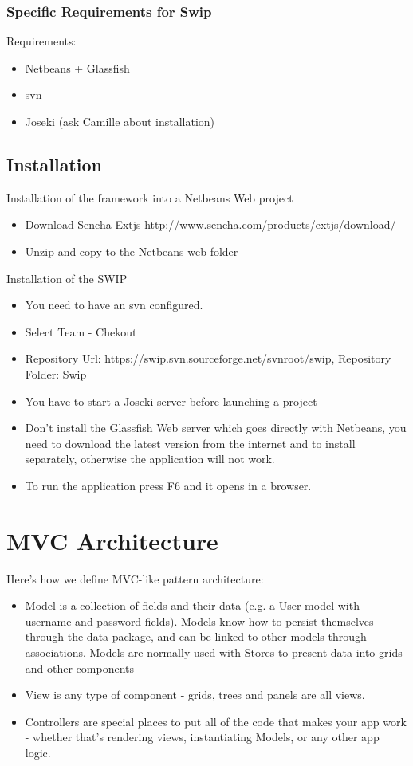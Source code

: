 \subsection{Specific Requirements for Swip}
\par Requirements:
\begin{itemize}
\item Netbeans + Glassfish
\item svn
\item Joseki (ask Camille about installation)
\end{itemize}
   
\section{Installation}

 Installation of the framework into a Netbeans Web project
\begin{itemize}
   \item Download Sencha Extjs  http://www.sencha.com/products/extjs/download/
   \item Unzip and copy to the Netbeans web folder
\end{itemize}
 Installation of the SWIP
\begin{itemize}  
\item You need to have an svn configured.
\item Select Team - Chekout 
\item Repository Url: https://swip.svn.sourceforge.net/svnroot/swip, Repository Folder: Swip
\item You have to start a Joseki server before launching a project
\item Don’t install the Glassfish Web server which goes directly with Netbeans, you need to download the latest version from the internet and to install separately, otherwise the application will not work.
\item To run the application press F6 and it opens in a browser.
\end{itemize}

\chapter{MVC Architecture}
\par Here's how we define MVC-like pattern architecture:
\begin{itemize} 
\item Model is a collection of fields and their data (e.g. a User model with username and password fields). Models know how to persist themselves through the data package, and can be linked to other models through associations. Models are normally used with Stores to present data into grids and other components
\item View is any type of component - grids, trees and panels are all views.
\item Controllers are special places to put all of the code that makes your app work - whether that's rendering views, instantiating Models, or any other app logic.
\end{itemize}
